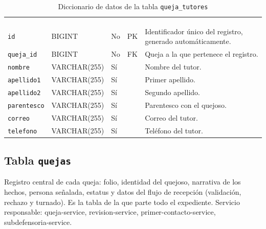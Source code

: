\footnotesize
\renewcommand{\arraystretch}{1.15}
\setlength{\tabcolsep}{4pt}
\begin{longtable}{|L{3.9cm}|L{2.4cm}|L{0.9cm}|L{1.2cm}|L{6.6cm}|}
	\hiderowcolors\caption{Diccionario de datos de la tabla \texttt{queja\_tutores}}
	\label{tab:dic_queja_tutores} \\ \showrowcolors
	\hline
	 &  &  &  &  \\
	\hline
	\endfirsthead
	\hline
	 &  &  &  &  \\
	\hline
	\endhead
		\texttt{id} & BIGINT & No & PK & Identificador único del registro, generado automáticamente. \\ \hline
		\texttt{queja\_\allowbreak{}id} & BIGINT & No & FK & Queja a la que pertenece el registro. \\ \hline
		\texttt{nombre} & VARCHAR(255) & Sí &  & Nombre del tutor. \\ \hline
		\texttt{apellido1} & VARCHAR(255) & Sí &  & Primer apellido. \\ \hline
		\texttt{apellido2} & VARCHAR(255) & Sí &  & Segundo apellido. \\ \hline
		\texttt{parentesco} & VARCHAR(255) & Sí &  & Parentesco con el quejoso. \\ \hline
		\texttt{correo} & VARCHAR(255) & Sí &  & Correo del tutor. \\ \hline
		\texttt{telefono} & VARCHAR(255) & Sí &  & Teléfono del tutor. \\ \hline
\end{longtable}
\normalsize
\setlength{\tabcolsep}{6pt}
\renewcommand{\arraystretch}{1}

\subsection{Tabla \texttt{quejas}}
Registro central de cada queja: folio, identidad del quejoso, narrativa de los hechos, persona señalada, estatus y datos del flujo de recepción (validación, rechazo y turnado). Es la tabla de la que parte todo el expediente. Servicio responsable: queja-service, revision-service, primer-contacto-service, subdefensoria-service.


